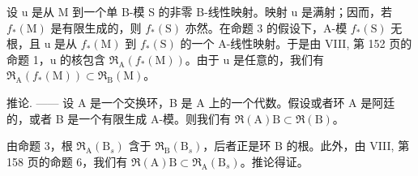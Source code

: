 设 u 是从 M 到一个单 B-模 S 的非零 B-线性映射。映射 u 是满射；因而，若 \(f_{*}(\mathrm{M})\) 是有限生成的，则 \(f_{*}(\mathrm{S})\) 亦然。在命题 3 的假设下，A-模 \(f_{*}(\mathrm{S})\) 无根，且 u 是从 \(f_{*}(\mathrm{M})\) 到 \(f_{*}(\mathrm{S})\) 的一个 A-线性映射。于是由 VIII, 第 152 页的命题 1，u 的核包含 \(\mathfrak{R}_{\mathrm{A}}(f_{*}(\mathrm{M}))\)。由于 u 是任意的，我们有 \(\mathfrak{R}_{\mathrm{A}}(f_{*}(\mathrm{M})) \subset \mathfrak{R}_{\mathrm{B}}(\mathrm{M})\)。

推论. —— 设 A 是一个交换环，B 是 A 上的一个代数。假设或者环 A 是阿廷的，或者 B 是一个有限生成 A-模。则我们有 \(\Re(\mathrm{A})\mathrm{B}\subset\Re(\mathrm{B})\)。

由命题 3，根 \(\mathfrak{R}_{\mathrm{A}}(\mathrm{B}_{s})\) 含于 \(\mathfrak{R}_{\mathrm{B}}(\mathrm{B}_{s})\)，后者正是环 B 的根。此外，由 VIII, 第 158 页的命题 6，我们有 \(\mathfrak{R}(\mathrm{A})\mathrm{B}\subset\mathfrak{R}_{\mathrm{A}}(\mathrm{B}_{s})\)。推论得证。

